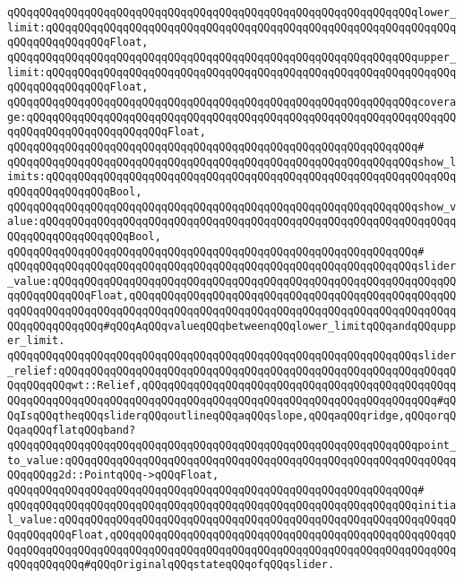 \verb|qQQqqQQqqQQqqQQqqQQqqQQqqQQqqQQqqQQqqQQqqQQqqQQqqQQqqQQqqQQqqQQqlower_limit:qQQqqQQqqQQqqQQqqQQqqQQqqQQqqQQqqQQqqQQqqQQqqQQqqQQqqQQqqQQqqQQqqQQqqQQqqQQqqQQqFloat,|\newline
\verb|qQQqqQQqqQQqqQQqqQQqqQQqqQQqqQQqqQQqqQQqqQQqqQQqqQQqqQQqqQQqqQQqupper_limit:qQQqqQQqqQQqqQQqqQQqqQQqqQQqqQQqqQQqqQQqqQQqqQQqqQQqqQQqqQQqqQQqqQQqqQQqqQQqqQQqFloat,|\newline
\verb|qQQqqQQqqQQqqQQqqQQqqQQqqQQqqQQqqQQqqQQqqQQqqQQqqQQqqQQqqQQqqQQqcoverage:qQQqqQQqqQQqqQQqqQQqqQQqqQQqqQQqqQQqqQQqqQQqqQQqqQQqqQQqqQQqqQQqqQQqqQQqqQQqqQQqqQQqqQQqqQQqFloat,|\newline
\verb|qQQqqQQqqQQqqQQqqQQqqQQqqQQqqQQqqQQqqQQqqQQqqQQqqQQqqQQqqQQqqQQq#|\newline
\verb|qQQqqQQqqQQqqQQqqQQqqQQqqQQqqQQqqQQqqQQqqQQqqQQqqQQqqQQqqQQqqQQqshow_limits:qQQqqQQqqQQqqQQqqQQqqQQqqQQqqQQqqQQqqQQqqQQqqQQqqQQqqQQqqQQqqQQqqQQqqQQqqQQqqQQqBool,|\newline
\verb|qQQqqQQqqQQqqQQqqQQqqQQqqQQqqQQqqQQqqQQqqQQqqQQqqQQqqQQqqQQqqQQqshow_value:qQQqqQQqqQQqqQQqqQQqqQQqqQQqqQQqqQQqqQQqqQQqqQQqqQQqqQQqqQQqqQQqqQQqqQQqqQQqqQQqqQQqBool,|\newline
\verb|qQQqqQQqqQQqqQQqqQQqqQQqqQQqqQQqqQQqqQQqqQQqqQQqqQQqqQQqqQQqqQQq#|\newline
\verb|qQQqqQQqqQQqqQQqqQQqqQQqqQQqqQQqqQQqqQQqqQQqqQQqqQQqqQQqqQQqqQQqslider_value:qQQqqQQqqQQqqQQqqQQqqQQqqQQqqQQqqQQqqQQqqQQqqQQqqQQqqQQqqQQqqQQqqQQqqQQqqQQqFloat,qQQqqQQqqQQqqQQqqQQqqQQqqQQqqQQqqQQqqQQqqQQqqQQqqQQqqQQqqQQqqQQqqQQqqQQqqQQqqQQqqQQqqQQqqQQqqQQqqQQqqQQqqQQqqQQqqQQqqQQqqQQqqQQqqQQqqQQq#qQQqAqQQqvalueqQQqbetweenqQQqlower_limitqQQqandqQQqupper_limit.|\newline
\verb|qQQqqQQqqQQqqQQqqQQqqQQqqQQqqQQqqQQqqQQqqQQqqQQqqQQqqQQqqQQqqQQqslider_relief:qQQqqQQqqQQqqQQqqQQqqQQqqQQqqQQqqQQqqQQqqQQqqQQqqQQqqQQqqQQqqQQqqQQqqQQqwt::Relief,qQQqqQQqqQQqqQQqqQQqqQQqqQQqqQQqqQQqqQQqqQQqqQQqqQQqqQQqqQQqqQQqqQQqqQQqqQQqqQQqqQQqqQQqqQQqqQQqqQQqqQQqqQQqqQQqqQQq#qQQqIsqQQqtheqQQqsliderqQQqoutlineqQQqaqQQqslope,qQQqaqQQqridge,qQQqorqQQqaqQQqflatqQQqband?|\newline
\verb|qQQqqQQqqQQqqQQqqQQqqQQqqQQqqQQqqQQqqQQqqQQqqQQqqQQqqQQqqQQqqQQqpoint_to_value:qQQqqQQqqQQqqQQqqQQqqQQqqQQqqQQqqQQqqQQqqQQqqQQqqQQqqQQqqQQqqQQqqQQqg2d::PointqQQq->qQQqFloat,|\newline
\verb|qQQqqQQqqQQqqQQqqQQqqQQqqQQqqQQqqQQqqQQqqQQqqQQqqQQqqQQqqQQqqQQq#|\newline
\verb|qQQqqQQqqQQqqQQqqQQqqQQqqQQqqQQqqQQqqQQqqQQqqQQqqQQqqQQqqQQqqQQqinitial_value:qQQqqQQqqQQqqQQqqQQqqQQqqQQqqQQqqQQqqQQqqQQqqQQqqQQqqQQqqQQqqQQqqQQqqQQqFloat,qQQqqQQqqQQqqQQqqQQqqQQqqQQqqQQqqQQqqQQqqQQqqQQqqQQqqQQqqQQqqQQqqQQqqQQqqQQqqQQqqQQqqQQqqQQqqQQqqQQqqQQqqQQqqQQqqQQqqQQqqQQqqQQqqQQqqQQq#qQQqOriginalqQQqstateqQQqofqQQqslider.|\newline
